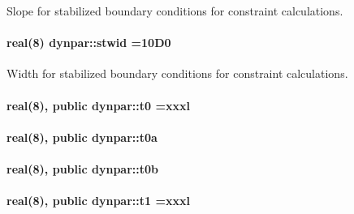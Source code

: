 Slope for stabilized boundary conditions for constraint calculations. 

\paragraph[{\texorpdfstring{stwid}{stwid}}]{\setlength{\rightskip}{0pt plus 5cm}real(8) dynpar\+::stwid =10\+D0}\hypertarget{namespacedynpar_a7636644e83a92739e1cf1071ccfd6f6d}{}\label{namespacedynpar_a7636644e83a92739e1cf1071ccfd6f6d}


Width for stabilized boundary conditions for constraint calculations. 

\paragraph[{\texorpdfstring{t0}{t0}}]{\setlength{\rightskip}{0pt plus 5cm}real(8), public dynpar\+::t0 =xxxl}\hypertarget{namespacedynpar_a2b1194ee3dd6225c16841f068e72dcb1}{}\label{namespacedynpar_a2b1194ee3dd6225c16841f068e72dcb1}
\paragraph[{\texorpdfstring{t0a}{t0a}}]{\setlength{\rightskip}{0pt plus 5cm}real(8), public dynpar\+::t0a}\hypertarget{namespacedynpar_a681cb5c9252ca4a841129d53e48dd8fc}{}\label{namespacedynpar_a681cb5c9252ca4a841129d53e48dd8fc}
\paragraph[{\texorpdfstring{t0b}{t0b}}]{\setlength{\rightskip}{0pt plus 5cm}real(8), public dynpar\+::t0b}\hypertarget{namespacedynpar_a91a3c596507a193726e3767b0b42e939}{}\label{namespacedynpar_a91a3c596507a193726e3767b0b42e939}
\paragraph[{\texorpdfstring{t1}{t1}}]{\setlength{\rightskip}{0pt plus 5cm}real(8), public dynpar\+::t1 =xxxl}\hypertarget{namespacedynpar_ad299be5ee883b4d581da154ccd7e6122}{}\label{namespacedynpar_ad299be5ee883b4d581da154ccd7e6122}
